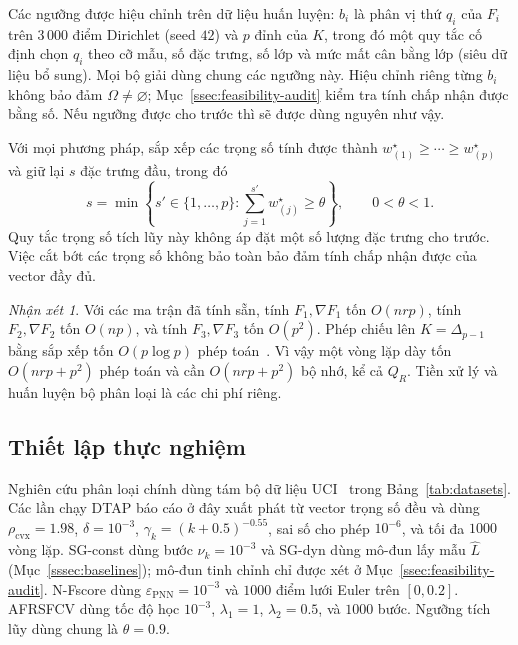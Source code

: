 \documentclass[]{interact}
\theoremstyle{plain}
\theoremstyle{definition}
\theoremstyle{remark}
\newtheorem{remark}{Nhận xét}
\newcommand{\cvx}{\mathrm{cvx}}
\begin{document}
Các ngưỡng được hiệu chỉnh trên dữ liệu huấn luyện: $b_i$ là phân vị thứ $q_i$ của $F_i$ trên $3\,000$ điểm Dirichlet (seed $42$) và $p$ đỉnh của $K$, trong đó một quy tắc cố định chọn $q_i$ theo cỡ mẫu, số đặc trưng, số lớp và mức mất cân bằng lớp (siêu dữ liệu bổ sung). Mọi bộ giải dùng chung các ngưỡng này. Hiệu chỉnh riêng từng $b_i$ không bảo đảm $\Omega\ne\varnothing$; Mục~\ref{ssec:feasibility-audit} kiểm tra tính chấp nhận được bằng số. Nếu ngưỡng được cho trước thì sẽ được dùng nguyên như vậy.

Với mọi phương pháp, sắp xếp các trọng số tính được thành $w^\star_{(1)}\ge\cdots\ge w^\star_{(p)}$ và giữ lại $s$ đặc trưng đầu, trong đó
\begin{equation}\label{eq:thetaRule}
s=\min\left\{s'\in\{1,\ldots,p\}:\sum_{j=1}^{s'}w^\star_{(j)}\ge\theta\right\},\qquad 0<\theta<1.
\end{equation}
Quy tắc trọng số tích lũy này không áp đặt một số lượng đặc trưng cho trước. Việc cắt bớt các trọng số không bảo toàn bảo đảm tính chấp nhận được của vector đầy đủ.

\begin{remark}\label{rem:fs-cost}
Với các ma trận đã tính sẵn, tính $F_1,\nabla F_1$ tốn $O(nrp)$, tính $F_2,\nabla F_2$ tốn $O(np)$, và tính $F_3,\nabla F_3$ tốn $O(p^2)$. Phép chiếu lên $K=\Delta_{p-1}$ bằng sắp xếp tốn $O(p\log p)$ phép toán~\citep{condat2016simplex}. Vì vậy một vòng lặp dày tốn $O(nrp+p^2)$ phép toán và cần $O(nrp+p^2)$ bộ nhớ, kể cả $Q_R$. Tiền xử lý và huấn luyện bộ phân loại là các chi phí riêng.
\end{remark}

\subsection{Thiết lập thực nghiệm}\label{ssec:setup}
Nghiên cứu phân loại chính dùng tám bộ dữ liệu UCI~\citep{kelly2023uci} trong Bảng~\ref{tab:datasets}. Các lần chạy DTAP báo cáo ở đây xuất phát từ vector trọng số đều và dùng $\rho_{\cvx}=1.98$, $\delta=10^{-3}$, $\gamma_k=(k+0.5)^{-0.55}$, sai số cho phép $10^{-6}$, và tối đa $1000$ vòng lặp. SG-const dùng bước $\nu_k=10^{-3}$ và SG-dyn dùng mô-đun lấy mẫu $\widehat L$ (Mục~\ref{sssec:baselines}); mô-đun tinh chỉnh chỉ được xét ở Mục~\ref{ssec:feasibility-audit}. N-Fscore dùng $\varepsilon_{\mathrm{PNN}}=10^{-3}$ và $1000$ điểm lưới Euler trên $[0,0.2]$. AFRSFCV dùng tốc độ học $10^{-3}$, $\lambda_1=1$, $\lambda_2=0.5$, và $1000$ bước. Ngưỡng tích lũy dùng chung là $\theta=0.9$.
\end{document}
